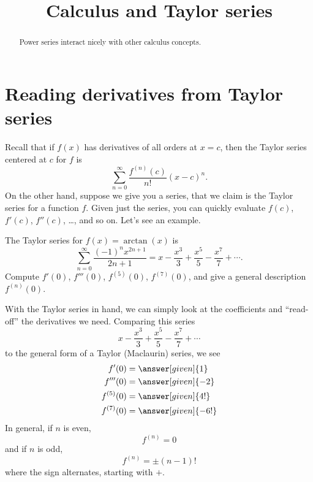 \documentclass{ximera}
\title[Dig-In:]{Calculus and Taylor series}
\begin{document}
\begin{abstract}
  Power series interact nicely with other calculus concepts.
\end{abstract}
\maketitle

\section{Reading derivatives from Taylor series}

Recall that if $f(x)$ has derivatives of all orders at $x=c$, then the
Taylor series centered at $c$ for $f$ is
\[
\sum_{n=0}^\infty \frac{f^{(n)}(c)}{n!}(x-c)^n.
\]
On the other hand, suppose we give you a series, that we claim is the
Taylor series for a function $f$. Given just the series, you can
quickly evaluate $f(c)$, $f'(c)$, $f''(c)$, \dots, and so on. Let's
see an example.

\begin{example}
  The Taylor series for $f(x) = \arctan(x)$ is
  \[
  \sum_{n=0}^\infty \frac{(-1)^n x^{2n+1}}{2n+1} = x - \frac{x^3}{3} + \frac{x^5}{5} - \frac{x^7}{7} +\cdots.
  \]
  Compute $f'(0)$, $f'''(0)$, $f^{(5)}(0)$, $f^{(7)}(0)$, and give a
  general description $f^{(n)}(0)$.
  \begin{explanation}
    With the Taylor series in hand, we can simply look at the
    coefficients and ``read-off'' the derivatives we need. Comparing this series
    \[
    x - \frac{x^3}{3} + \frac{x^5}{5} - \frac{x^7}{7} +\cdots
    \]
    to the general form of a Taylor (Maclaurin) series, we see
    \begin{align*}
    f'(0) &= \answer[given]{1}\\
    f'''(0) &= \answer[given]{-2}\\
    f^{(5)}(0) &= \answer[given]{4!}\\
    f^{(7)}(0) &= \answer[given]{-6!}
    \end{align*}
    In general, if $n$ is even,
    \[
    f^{(n)} = 0
    \]
    and if $n$ is odd,
    \[
    f^{(n)} = \pm(n-1)! 
    \]
    where the sign alternates, starting with $+$.
  \end{explanation}
\end{example}
\end{document}
